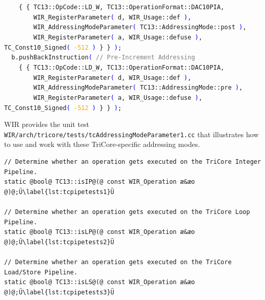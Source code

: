 \begin{wirExample}
{\verb|    |\texttt{\{ \{ TC13::OpCode::LD\_W, TC13::OperationFormat::DAC10PIA,} \\
\verb|        |\texttt{WIR\_RegisterParameter\textcolor{blue}{(} d, WIR\_Usage::def \textcolor{blue}{)},} \\
\verb|        |\texttt{WIR\_AddressingModeParameter\textcolor{blue}{(} TC13::AddressingMode::post \textcolor{blue}{)},} \\
\verb|        |\texttt{WIR\_RegisterParameter\textcolor{blue}{(} a, WIR\_Usage::defuse \textcolor{blue}{)}, TC\_Const10\_Signed\textcolor{blue}{(} \textcolor{orange}{-512} \textcolor{blue}{)} \} \} \textcolor{blue}{)};} \\
\verb|  |\texttt{b.pushBackInstruction\textcolor{blue}{(} \textcolor{gray}{// Pre-Increment Addressing}} \\
\verb|    |\texttt{\{ \{ TC13::OpCode::LD\_W, TC13::OperationFormat::DAC10PIA,} \\
\verb|        |\texttt{WIR\_RegisterParameter\textcolor{blue}{(} d, WIR\_Usage::def \textcolor{blue}{)},} \\
\verb|        |\texttt{WIR\_AddressingModeParameter\textcolor{blue}{(} TC13::AddressingMode::pre \textcolor{blue}{)},} \\
\verb|        |\texttt{WIR\_RegisterParameter\textcolor{blue}{(} a, WIR\_Usage::defuse \textcolor{blue}{)}, TC\_Const10\_Signed\textcolor{blue}{(} \textcolor{orange}{-512} \textcolor{blue}{)} \} \} \textcolor{blue}{)};}
}
\end{wirExample}

\gls{WIR} provides the unit test \texttt{WIR/arch/tricore/tests/tcAddressingModeParameter1.cc} that illustrates how to use and work with these TriCore-specific addressing modes.

\begin{lstlisting}[style=code,float=t,caption={Testing of Pipeline Properties of Class \texttt{TC13}},label=lst:tcpipetests]
// Determine whether an operation gets executed on the TriCore Integer Pipeline.
static @bool@ TC13::isIP@(@ const WIR_Operation æ&æo @)@;Ü\label{lst:tcpipetests1}Ü

// Determine whether an operation gets executed on the TriCore Loop Pipeline.
static @bool@ TC13::isLP@(@ const WIR_Operation æ&æo @)@;Ü\label{lst:tcpipetests2}Ü

// Determine whether an operation gets executed on the TriCore Load/Store Pipeline.
static @bool@ TC13::isLS@(@ const WIR_Operation æ&æo @)@;Ü\label{lst:tcpipetests3}Ü
\end{lstlisting}

